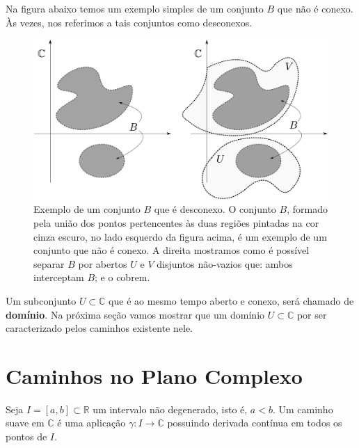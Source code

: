 Na figura abaixo temos um exemplo simples de um conjunto $B$ que não é conexo.
Às vezes, nos referimos a tais conjuntos como desconexos. 


\begin{figure}[H]
\centering
\includegraphics[width=0.9\linewidth]{"Figuras/fig-conjunto-desconexo"}
\caption[Conjunto Conexo]{Exemplo de um conjunto $B$ que é desconexo. 
O conjunto $B$, formado pela união dos pontos pertencentes às duas regiões pintadas na
cor cinza escuro, no lado esquerdo da figura acima, é um exemplo de um conjunto que não é conexo. 
A direita mostramos como é possível separar $B$ 
por abertos $U$ e $V$ disjuntos não-vazios que: ambos interceptam $B$; e o cobrem.}
\label{fig:conjunto-desconexo}
\end{figure}


Um subconjunto $U\subset\mathbb{C}$ que é ao mesmo tempo aberto e conexo, 
será chamado de 
{\bf domínio}. Na próxima seção vamos mostrar que 
um domínio $U\subset \mathbb{C}$ por ser caracterizado pelos
caminhos existente nele. 



\section{Caminhos no Plano Complexo}

\begin{definicao}\label{def-caminho-em-C}
Seja $I=[a,b]\subset\mathbb{R}$ um intervalo não degenerado, isto é, $a<b$. 
Um caminho suave 
em $\mathbb{C}$ é uma aplicação $\gamma:I\to \mathbb{C}$
possuindo derivada contínua em todos os pontos de $I$.
\end{definicao}

